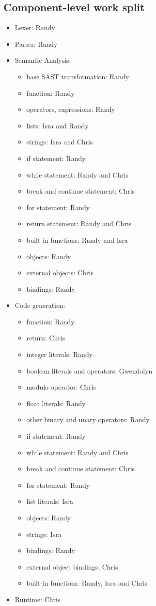 \subsection{Component-level work split}

\begin{itemize}
\item Lexer: Randy
\item Parser: Randy
\item Semantic Analysis:
  \begin{itemize}
  \item base SAST transformation: Randy
  \item function: Randy
  \item operators, expressions: Randy
  \item lists: Isra and Randy
  \item strings: Isra and Chris
  \item if statement: Randy
  \item while statement: Randy and Chris
  \item break and continue statement: Chris
  \item for statement: Randy
  \item return statement: Randy and Chris
  \item built-in functions: Randy and Isra
  \item objects: Randy
  \item external objects: Chris
  \item bindings: Randy
  \end{itemize}
\item Code generation:
  \begin{itemize}
    \item function: Randy
    \item return: Chris
    \item integer literals: Randy
    \item boolean literals and operators: Gwendolyn
    \item modulo operator: Chris
    \item float literals: Randy
    \item other binary and unary operators: Randy
    \item if statement: Randy
    \item while statement: Randy and Chris
    \item break and continue statement: Chris
    \item for statement: Randy
    \item list literals: Isra
    \item objects: Randy
    \item strings: Isra
    \item bindings: Randy
    \item external object bindings: Chris
    \item built-in functions: Randy, Isra and Chris
  \end{itemize}
\item Runtime: Chris
\end{itemize}
